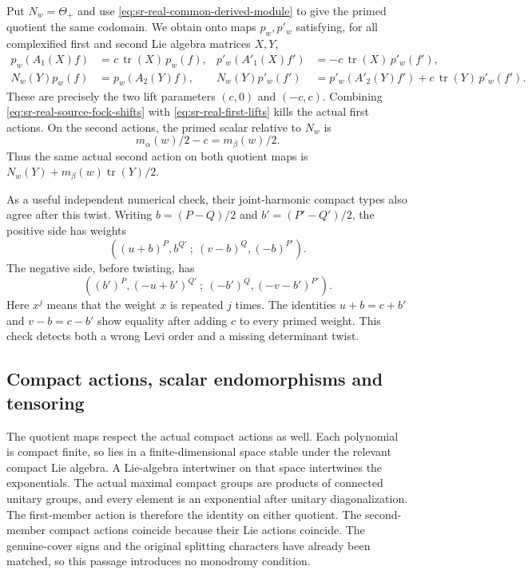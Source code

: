 Put \(N_w=\Theta_+\) and use
\eqref{eq:sr-real-common-derived-module} to give the primed
quotient the same codomain. We obtain onto maps \(p_w,p'_w\)
satisfying, for all complexified first and second Lie algebra
matrices \(X,Y\),
\begin{align}
 p_w(A_1(X)f)&=c\,\operatorname{tr}(X)\,p_w(f),&
 p'_w(A'_1(X)f')&=-c\,\operatorname{tr}(X)\,p'_w(f'),\label{eq:sr-real-first-lifts}\\
 N_w(Y)p_w(f)&=p_w(A_2(Y)f),&
 N_w(Y)p'_w(f')&=p'_w(A'_2(Y)f')+
                        c\,\operatorname{tr}(Y)\,p'_w(f').
 \label{eq:sr-real-second-lifts}
\end{align}
These are precisely the two lift parameters \((c,0)\)
and \((-c,c)\).
Combining \eqref{eq:sr-real-source-fock-shifts} with
\eqref{eq:sr-real-first-lifts} kills the actual first actions.
On the second actions, the primed scalar relative to \(N_w\) is
\[
                m_\alpha(w)/2-c=m_\beta(w)/2.
\]
Thus the same actual second action on both quotient maps is
\(N_w(Y)+m_\beta(w)\operatorname{tr}(Y)/2\).

As a useful independent numerical check, their joint-harmonic
compact types also agree after this twist. Writing
\(b=(P-Q)/2\) and \(b'=(P'-Q')/2\), the positive side has weights
\[
 ( (u+b)^P,b^{Q'}\ ;\ (v-b)^Q,(-b)^{P'} ).
\]
The negative side, before twisting, has
\[
 ( (b')^P,(-u+b')^{Q'}\ ;\
                    (-b')^Q,(-v-b')^{P'} ).
\]
Here \(x^j\) means that the weight \(x\) is repeated \(j\)
times. The identities \(u+b=c+b'\) and
\(v-b=c-b'\) show equality after adding \(c\) to every
primed weight. This check detects both a wrong Levi order
and a missing determinant twist.

\subsection{Compact actions, scalar endomorphisms and tensoring}
The quotient maps respect the actual compact actions as well.
Each polynomial is compact finite, so lies in a finite-dimensional
space stable under the relevant compact Lie algebra.
A Lie-algebra intertwiner on that space intertwines the
exponentials. The actual maximal compact groups are products
of connected unitary groups, and every element is an
exponential after unitary diagonalization. The first-member
action is therefore the identity on either quotient.
The second-member compact actions coincide because their
Lie actions coincide. The genuine-cover signs and the
original splitting characters have already been matched,
so this passage introduces no monodromy condition.

